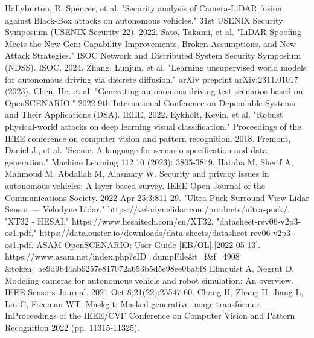 \documentclass[conference]{IEEEtran}
\begin{document}
\begin{thebibliography}{00}
Hallyburton, R. Spencer, et al. "Security analysis of {Camera-LiDAR} fusion against {Black-Box} attacks on autonomous vehicles." 31st USENIX Security Symposium (USENIX Security 22). 2022.
 Sato, Takami, et al. "LiDAR Spoofing Meets the New-Gen: Capability Improvements, Broken Assumptions, and New Attack Strategies." ISOC Network and Distributed System Security Symposium (NDSS). ISOC, 2024.
Zhang, Lunjun, et al. "Learning unsupervised world models for autonomous driving via discrete diffusion." arXiv preprint arXiv:2311.01017 (2023).
 Chen, He, et al. "Generating autonomous driving test scenarios based on OpenSCENARIO." 2022 9th International Conference on Dependable Systems and Their Applications (DSA). IEEE, 2022.
 Eykholt, Kevin, et al. "Robust physical-world attacks on deep learning visual classification." Proceedings of the IEEE conference on computer vision and pattern recognition. 2018.
 Fremont, Daniel J., et al. "Scenic: A language for scenario specification and data generation." Machine Learning 112.10 (2023): 3805-3849.
 Hataba M, Sherif A, Mahmoud M, Abdallah M, Alasmary W. Security and privacy issues in autonomous vehicles: A layer-based survey. IEEE Open Journal of the Communications Society. 2022 Apr 25;3:811-29.
 "Ultra Puck Surround View Lidar Sensor — Velodyne Lidar," https://velodynelidar.com/products/ultra-puck/.
 "XT32 - HESAI," https://www.hesaitech.com/en/XT32.
"datasheet-rev06-v2p3-os1.pdf," https://data.ouster.io/downloads/data sheets/datasheet-rev06-v2p3-os1.pdf.
ASAM  OpenSCENARIO:  User  Guide  [EB/OL].[2022-05-13]. https://www.asam.net/index.php?eID=dumpFile\&t=f\&f=4908
\&token=ae9d9b44ab9257e817072a653b5d5e98ee0babf8
Elmquist A, Negrut D. Modeling cameras for autonomous vehicle and robot simulation: An overview. IEEE Sensors Journal. 2021 Oct 8;21(22):25547-60.
Chang H, Zhang H, Jiang L, Liu C, Freeman WT. Maskgit: Masked generative image transformer. InProceedings of the IEEE/CVF Conference on Computer Vision and Pattern Recognition 2022 (pp. 11315-11325).
\end{thebibliography}
\end{document}
